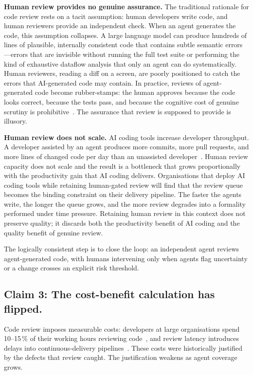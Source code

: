 \documentclass[10pt,conference]{IEEEtran}
\begin{document}
\textbf{Human review provides no genuine assurance.}
The traditional rationale for code review rests on a tacit assumption: human developers write code, and human reviewers provide an independent check.
When an agent generates the code, this assumption collapses.
A large language model can produce hundreds of lines of plausible, internally consistent code that contains subtle semantic errors—errors that are invisible without running the full test suite or performing the kind of exhaustive dataflow analysis that only an agent can do systematically.
Human reviewers, reading a diff on a screen, are poorly positioned to catch the errors that AI-generated code may contain.
In practice, reviews of agent-generated code become rubber-stamps: the human approves because the code looks correct, because the tests pass, and because the cognitive cost of genuine scrutiny is prohibitive~\cite{czerwonka2015code}.
The assurance that review is supposed to provide is illusory.

\textbf{Human review does not scale.}
AI coding tools increase developer throughput.
A developer assisted by an agent produces more commits, more pull requests, and more lines of changed code per day than an unassisted developer~\cite{peng2023impact}.
Human review capacity does not scale and 
the result is a bottleneck that grows proportionally with the productivity gain that AI coding delivers.
Organisations that deploy AI coding tools while retaining human-gated review will find that the review queue becomes the binding constraint on their delivery pipeline.
The faster the agents write, the longer the queue grows, and the more review degrades into a formality performed under time pressure.
Retaining human review in this context does not preserve quality; it discards both the productivity benefit of AI coding and the quality benefit of genuine review.

The logically consistent step is to close the loop: an independent agent reviews agent-generated code, with humans intervening only when agents flag uncertainty or a change crosses an explicit risk threshold.

\subsection{Claim 3: The cost-benefit calculation has flipped.}

Code review imposes measurable costs: developers at large organisations spend 10--15\,\% of their working hours reviewing code~\cite{sadowski2018modern}, and review latency introduces delays into continuous-delivery pipelines~\cite{hilton2016usage,shahin2017continuous}.
These costs were historically justified by the defects that review caught.
The justification weakens as agent coverage grows.
\end{document}
